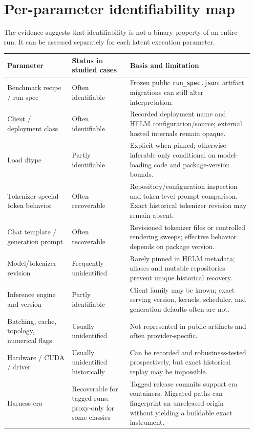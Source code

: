 \documentclass[11pt]{report}
\newcommand{\file}[1]{\texttt{#1}}
\begin{document}
\section{Per-parameter identifiability map}

The evidence suggests that identifiability is not a binary property of an entire
run. It can be assessed separately for each latent execution parameter.

\begin{longtable}{@{}p{}p{}p{}@{}}
\toprule
\textbf{Parameter} & \textbf{Status in studied cases} & \textbf{Basis and limitation} \\
\midrule
\endhead
Benchmark recipe / run spec & Often identifiable & Frozen public
\file{run\_spec.json}; artifact migrations can still alter interpretation. \\
Client / deployment class & Often identifiable & Recorded deployment name and
HELM configuration/source; external hosted internals remain opaque. \\
Load dtype & Partly identifiable & Explicit when pinned; otherwise inferable only
conditional on model-loading code and package-version bounds. \\
Tokenizer special-token behavior & Often recoverable & Repository/configuration
inspection and token-level prompt comparison. Exact historical tokenizer revision
may remain absent. \\
Chat template / generation prompt & Often recoverable & Revisioned tokenizer files
or controlled rendering sweeps; effective behavior depends on package version. \\
Model/tokenizer revision & Frequently unidentified & Rarely pinned in HELM
metadata; aliases and mutable repositories prevent unique historical recovery. \\
Inference engine and version & Partly identifiable & Client family may be known;
exact serving version, kernels, scheduler, and generation defaults often are not. \\
Batching, cache, topology, numerical flags & Usually unidentified & Not represented
in public artifacts and often provider-specific. \\
Hardware / CUDA / driver & Usually unidentified historically & Can be recorded and
robustness-tested prospectively, but exact historical replay may be impossible. \\
Harness era & Recoverable for tagged runs; proxy-only for some classics & Tagged
release commits support era containers. Migrated paths can fingerprint an unreleased
origin without yielding a buildable exact instrument. \\
\bottomrule
\end{longtable}
\end{document}
